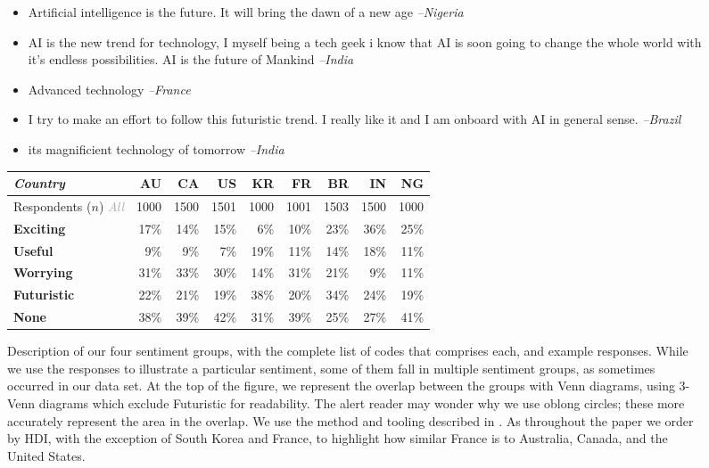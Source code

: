 \documentclass[sigconf]{acmart}
\newcommand\aff[1]{\textcolor{darkplum}{{\emph{--#1}}}}
\newcommand\gray[1]{\textcolor{darkgray}{#1}}
\newenvironment{lq1}
{ \begin{itemize}[leftmargin = 0em, label={}]
    \fontsize{8pt}{8.6pt}\selectfont
    \setlength{\itemsep}{2pt}
    \setlength{\parskip}{2pt}
    \setlength{\parsep}{2pt}       }
{ \end{itemize}                    }
\def\Exciting/{{\fontfamily{lmss}\selectfont\textbf{Exciting}}}  \def\Useful/{{\fontfamily{lmss}\selectfont\textbf{Useful}}}
\def\Worrying/{{\fontfamily{lmss}\selectfont\textbf{Worrying}}}
\def\Futuristic/{{\fontfamily{lmss}\selectfont\textbf{Futuristic}}}
\def\None/{{\fontfamily{lmss}\selectfont\textbf{None}}}
\begin{document}
\begin{figure*}[!ht]
\begin{multicols}{4}
\columnbreak

\begin{lq1}
\item Artificial intelligence is the future. It will bring the dawn of a new age \aff{Nigeria}
\item AI is the new trend for technology, I myself being a tech geek i know that AI is soon going to change the whole world with it's endless possibilities. AI is the future of Mankind \aff{India}
\item Advanced technology \aff{France}
\item I try to make an effort to follow this futuristic trend. I really like it and I am onboard with AI in general sense. \aff{Brazil}
\item its magnificient technology of tomorrow \aff{India}
\end{lq1}

\end{multicols}   \vspace{-0.3cm}
  \caption{Description of our four sentiment groups, with the complete list of codes that comprises each, and example responses. While we use the responses to illustrate a particular sentiment, some of them fall in multiple sentiment groups, as sometimes occurred in our data set. At the top of the figure, we represent the overlap between the groups with Venn diagrams, using 3-Venn diagrams which exclude Futuristic for readability. The alert reader may wonder why we use oblong circles; these more accurately represent the area in the overlap. We use the method and tooling described in \protect\cite{micallef2014eulerape}. As throughout the paper we order by HDI, with the exception of South Korea and France, to highlight how similar France is to Australia, Canada, and the United States.}
  \label{fig:venn}
  \vspace{0.2cm}

  


\begin{tabular}{@{}l@{\hskip 1cm}rrrrrrrr@{}}

\emph{Country} & \bf AU & \bf CA & \bf US & \bf KR & \bf FR & \bf BR & \bf IN & \bf NG \\

\midrule
Respondents ($n$) \gray{\emph{All}} & 1000 & 1500 & 1501 & 1000 & 1001 & 1503 & 1500 & 1000 \\

\midrule
\Exciting/ &    17\% & 14\% & 15\% &  6\% &  10\% & 23\% & 36\% & 25\% \\
\Useful/ &       9\% &  9\% &  7\% & 19\% & 11\% & 14\% & 18\% & 11\% \\
\Worrying/ &    31\% & 33\% & 30\% & 14\% & 31\% & 21\% & 9\% &  11\% \\
\Futuristic/ &  22\% & 21\% & 19\% & 38\% & 20\% & 34\% & 24\% & 19\% \\
\None/ &        38\% & 39\% & 42\% & 31\% & 39\% & 25\% & 27\% & 41\% \\


\end{tabular}
\end{figure*}
\end{document}
